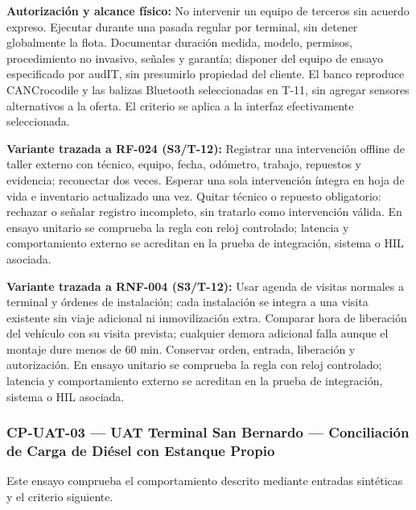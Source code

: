 \par\noindent\textbf{Autorización y alcance físico:} No intervenir un equipo de terceros sin acuerdo expreso. Ejecutar durante una pasada regular por terminal, sin detener globalmente la flota. Documentar duración medida, modelo, permisos, procedimiento no invasivo, señales y garantía; disponer del equipo de ensayo especificado por audIT, sin presumirlo propiedad del cliente. El banco reproduce CANCrocodile y las balizas Bluetooth seleccionadas en T-11, sin agregar sensores alternativos a la oferta. El criterio se aplica a la interfaz efectivamente seleccionada.\par

\par\noindent\textbf{Variante trazada a RF-024 (S3/T-12):} Registrar una intervención offline de taller externo con técnico, equipo, fecha, odómetro, trabajo, repuestos y evidencia; reconectar dos veces. Esperar una sola intervención íntegra en hoja de vida e inventario actualizado una vez. Quitar técnico o repuesto obligatorio: rechazar o señalar registro incompleto, sin tratarlo como intervención válida. En ensayo unitario se comprueba la regla con reloj controlado; latencia y comportamiento externo se acreditan en la prueba de integración, sistema o HIL asociada.\par

\par\noindent\textbf{Variante trazada a RNF-004 (S3/T-12):} Usar agenda de visitas normales a terminal y órdenes de instalación; cada instalación se integra a una visita existente sin viaje adicional ni inmovilización extra. Comparar hora de liberación del vehículo con su visita prevista; cualquier demora adicional falla aunque el montaje dure menos de 60 min. Conservar orden, entrada, liberación y autorización. En ensayo unitario se comprueba la regla con reloj controlado; latencia y comportamiento externo se acreditan en la prueba de integración, sistema o HIL asociada.\par


\subsubsection*{CP-UAT-03 — UAT Terminal San Bernardo — Conciliación de Carga de Diésel con Estanque Propio}\label{sec:9-cp-uat-03}
Este ensayo comprueba el comportamiento descrito mediante entradas sintéticas y el criterio siguiente.

